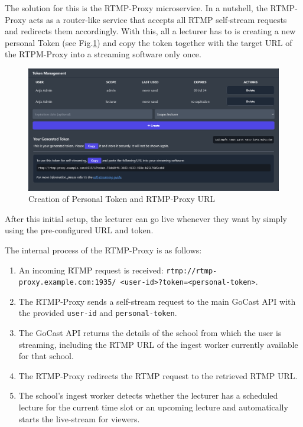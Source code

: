 The solution for this is the RTMP-Proxy microservice. In a nutshell, the RTMP-Proxy acts as a router-like service that accepts all \ac{RTMP} self-stream requests and redirects them accordingly. With this, all a lecturer has to is creating a new personal Token (see Fig.\ref{fig:personal-token}) and copy the token together with the target URL of the RTPM-Proxy into a streaming software only once.

\begin{figure}[htpb]
    \centering
    \includegraphics[width=\textwidth]{images/PersonalToken.png}
    \caption[Creation of Personal Token and RTMP-Proxy URL]{Creation of Personal Token and RTMP-Proxy URL}\label{fig:personal-token}
\end{figure}

After this initial setup, the lecturer can go live whenever they want by simply using the pre-configured URL and token.

The internal process of the RTMP-Proxy is as follows: 

\begin{enumerate}
    \item An incoming \ac{RTMP} request is received: 
    \texttt{rtmp://rtmp-proxy.example.com:1935/ <user-id>?token=<personal-token>}.
    \item The RTMP-Proxy sends a self-stream request to the main GoCast \ac{API} with the provided \texttt{user-id} and \texttt{personal-token}.
    \item The GoCast \ac{API} returns the details of the school from which the user is streaming, including the \ac{RTMP} URL of the ingest worker currently available for that school.
    \item The RTMP-Proxy redirects the \ac{RTMP} request to the retrieved \ac{RTMP} URL.
    \item The school's ingest worker detects whether the lecturer has a scheduled lecture for the current time slot or an upcoming lecture and automatically starts the live-stream for viewers.
\end{enumerate}

